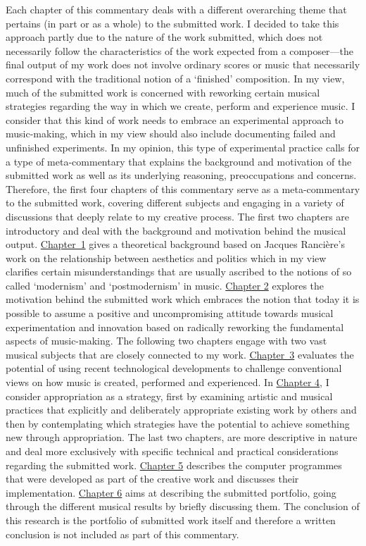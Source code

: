 Each chapter of this commentary deals with a different overarching theme that pertains (in part or as a whole) to the submitted work. I decided to take this approach partly due to the nature of the work submitted, which does not necessarily follow the characteristics of the work expected from a composer---the final output of my work does not involve ordinary scores or music that necessarily correspond with the traditional notion of a `finished' composition. In my view, much of the submitted work is concerned with reworking certain musical strategies regarding the way in which we create, perform and experience music. I consider that this kind of work needs to embrace an experimental approach to music-making, which in my view should also include documenting failed and unfinished experiments. In my opinion, this type of experimental practice calls for a type of meta-commentary that explains the background and motivation of the submitted work as well as its underlying reasoning, preoccupations and concerns. Therefore, the first four chapters of this commentary serve as a meta-commentary to the submitted work, covering different subjects and engaging in a variety of discussions that deeply relate to my creative process. The first two chapters are introductory and deal with the background and motivation behind the musical output. \hyperlink{chapter1}{\mbox{Chapter 1}} gives a theoretical background based on Jacques Ranci\`{e}re's work on the relationship between aesthetics and politics which in my view clarifies certain misunderstandings that are usually ascribed to the notions of so called `modernism' and `postmodernism' in music. \hyperlink{chapter2}{Chapter 2} explores the motivation behind the submitted work which embraces the notion that today it is possible to assume a positive and uncompromising attitude towards musical experimentation and innovation based on radically reworking the fundamental aspects of music-making. The following two chapters engage with two vast musical subjects that are closely connected to my work. \hyperlink{chapter3}{\mbox{Chapter 3}} evaluates the potential of using recent technological developments to challenge conventional views on how music is created, performed and experienced. In \hyperlink{chapter4}{Chapter 4}, I consider appropriation as a strategy, first by examining artistic and musical practices that explicitly and deliberately appropriate existing work by others and then by contemplating which strategies have the potential to achieve something new through appropriation. The last two chapters, are more descriptive in nature and deal more exclusively with specific technical and practical considerations regarding the submitted work. \hyperlink{chapter5}{Chapter 5} describes the computer programmes that were developed as part of the creative work and discusses their implementation. \hyperlink{chapter6}{Chapter 6} aims at describing the submitted portfolio, going through the different musical results by briefly discussing them. The conclusion of this research is the portfolio of submitted work itself and therefore a written conclusion is not included as part of this commentary.

\label{ch:preface}